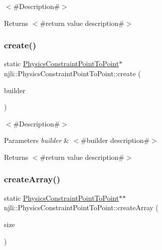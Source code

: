 $<$\#\+Description\#$>$

\begin{DoxyReturn}{Returns}
$<$\#return value description\#$>$ 
\end{DoxyReturn}
\mbox{\label{classnjli_1_1_physics_constraint_point_to_point_a10657194042f642076ba63d6e34246a8}} 
\subsubsection{\texorpdfstring{create()}{create()}\hspace{0.1cm}{\footnotesize\ttfamily [2/2]}}
{\footnotesize\ttfamily static \mbox{\hyperlink{classnjli_1_1_physics_constraint_point_to_point}{Physics\+Constraint\+Point\+To\+Point}}$\ast$ njli\+::\+Physics\+Constraint\+Point\+To\+Point\+::create (\begin{DoxyParamCaption}\item[{const \mbox{\hyperlink{classnjli_1_1_physics_constraint_point_to_point_builder}{Physics\+Constraint\+Point\+To\+Point\+Builder}} \&}]{builder }\end{DoxyParamCaption})\hspace{0.3cm}{\ttfamily [static]}}

$<$\#\+Description\#$>$


\begin{DoxyParams}{Parameters}
{\em builder} & $<$\#builder description\#$>$\\
\hline
\end{DoxyParams}
\begin{DoxyReturn}{Returns}
$<$\#return value description\#$>$ 
\end{DoxyReturn}
\mbox{\label{classnjli_1_1_physics_constraint_point_to_point_a267ed31f1fb0083be950281b9bea0385}} 
\subsubsection{\texorpdfstring{create\+Array()}{createArray()}}
{\footnotesize\ttfamily static \mbox{\hyperlink{classnjli_1_1_physics_constraint_point_to_point}{Physics\+Constraint\+Point\+To\+Point}}$\ast$$\ast$ njli\+::\+Physics\+Constraint\+Point\+To\+Point\+::create\+Array (\begin{DoxyParamCaption}\item[{const \mbox{\hyperlink{_util_8h_a10e94b422ef0c20dcdec20d31a1f5049}{u32}}}]{size }\end{DoxyParamCaption})\hspace{0.3cm}{\ttfamily [static]}}

